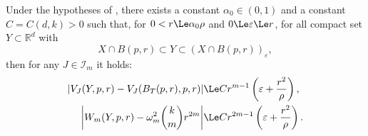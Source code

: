 \begin{theorem}%
\label{thm:stabilite-projections}
Under the hypotheses of , there exists a constant
$\alpha_0 \in (0,1)$ and a constant $C=C(d,k)>0$ such that, for $0<r
\Le \alpha_0 \rho$ and $0 \Le \varepsilon \Le r$, for all
compact set $Y\subset\mathbb R^d$ with
\begin{equation}
\label{eq:encadrement-Y}
    X \cap B(p,r) \subset Y \subset (X \cap B(p,r))_\varepsilon,
\end{equation}
then for any $J\in \mathcal{I}_m$ it holds:
\begin{align}
\label{eq:stabilite-VJ}
\left| V_J(Y,p,r)- V_J(B_T(p,r),p,r)\right|
& \Le C r^{m-1}\left( \varepsilon+\frac{r^2}{\rho} \right), \\
\label{eq:stabilite-W} 
\left| W_m(Y,p,r)-\omega_m^2\binom{k}{m}r^{2m} \right|
& \Le C r^{2m-1} \left( \varepsilon+\frac{r^2}{\rho} \right).
\end{align}
\end{theorem}
